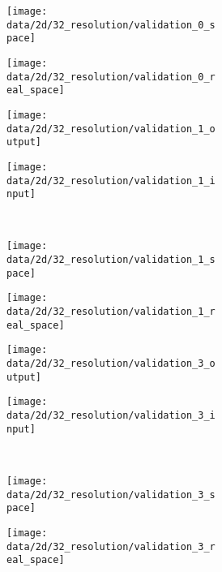 \begin{figure}
\begin{subfigure}[t]{0.25\textwidth}
    \begin{subfigure}[t]{0.49\textwidth}
      \texttt{[image: data/2d/32\_resolution/validation\_0\_space]}
    \end{subfigure}\hfill
    \begin{subfigure}[t]{0.49\textwidth}
      \texttt{[image: data/2d/32\_resolution/validation\_0\_real\_space]}
    \end{subfigure}
  \end{subfigure}
  \begin{subfigure}[t]{0.25\textwidth}
    \begin{subfigure}[t]{0.49\textwidth}
      \texttt{[image: data/2d/32\_resolution/validation\_1\_output]}
    \end{subfigure}\hfill
    \begin{subfigure}[t]{0.49\textwidth}
      \texttt{[image: data/2d/32\_resolution/validation\_1\_input]}
    \end{subfigure}\\[-2px]
    \begin{subfigure}[t]{0.49\textwidth}
      \texttt{[image: data/2d/32\_resolution/validation\_1\_space]}
    \end{subfigure}\hfill
    \begin{subfigure}[t]{0.49\textwidth}
      \texttt{[image: data/2d/32\_resolution/validation\_1\_real\_space]}
    \end{subfigure}
  \end{subfigure}
  \begin{subfigure}[t]{0.25\textwidth}
    \begin{subfigure}[t]{0.49\textwidth}
      \texttt{[image: data/2d/32\_resolution/validation\_3\_output]}
    \end{subfigure}\hfill
    \begin{subfigure}[t]{0.49\textwidth}
      \texttt{[image: data/2d/32\_resolution/validation\_3\_input]}
    \end{subfigure}\\[-2px]
    \begin{subfigure}[t]{0.49\textwidth}
      \texttt{[image: data/2d/32\_resolution/validation\_3\_space]}
    \end{subfigure}\hfill
    \begin{subfigure}[t]{0.49\textwidth}
      \texttt{[image: data/2d/32\_resolution/validation\_3\_real\_space]}
    \end{subfigure}
  \end{subfigure}

\end{figure}
